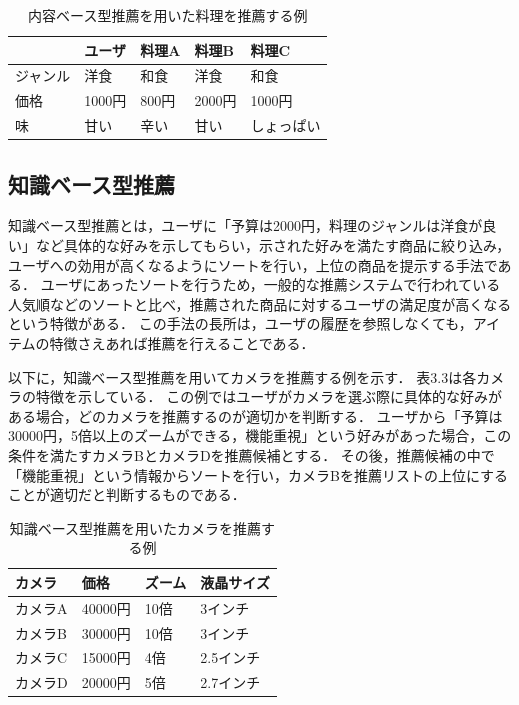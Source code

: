 \documentclass{funthesis}
\begin{document}
\begin{table}[htb]
  \begin{center}
  \scriptsize
    \caption{内容ベース型推薦を用いた料理を推薦する例}
    \normalsize
   \begin{tabular}{p{2.5cm}|p{2.5cm}||p{2.5cm}|p{2.5cm}|p{2.5cm}}
    \hline
    & ユーザ & 料理A & 料理B & 料理C  \\ \hline\hline
      ジャンル & 洋食 & 和食 & 洋食 & 和食 \\ \hline
      価格 & 1000円 & 800円 & 2000円 & 1000円 \\ \hline
      味 & 甘い & 辛い & 甘い & しょっぱい \\ \hline
  \end{tabular}
  \end{center}
\end{table}

\subsection{知識ベース型推薦}
知識ベース型推薦とは，ユーザに「予算は2000円，料理のジャンルは洋食が良い」など具体的な好みを示してもらい，示された好みを満たす商品に絞り込み，
ユーザへの効用が高くなるようにソートを行い，上位の商品を提示する手法である．
ユーザにあったソートを行うため，一般的な推薦システムで行われている人気順などのソートと比べ，推薦された商品に対するユーザの満足度が高くなるという特徴がある．
この手法の長所は，ユーザの履歴を参照しなくても，アイテムの特徴さえあれば推薦を行えることである．

以下に，知識ベース型推薦を用いてカメラを推薦する例を示す．
表3.3は各カメラの特徴を示している．
この例ではユーザがカメラを選ぶ際に具体的な好みがある場合，どのカメラを推薦するのが適切かを判断する．
ユーザから「予算は30000円，5倍以上のズームができる，機能重視」という好みがあった場合，この条件を満たすカメラBとカメラDを推薦候補とする．
その後，推薦候補の中で「機能重視」という情報からソートを行い，カメラBを推薦リストの上位にすることが適切だと判断するものである．

\begin{table}[htb]
  \begin{center}
  \scriptsize
    \caption{知識ベース型推薦を用いたカメラを推薦する例}
    \normalsize
   \begin{tabular}{p{3.3cm}||p{3.3cm}|p{3.3cm}|p{3.3cm}}
    \hline
カメラ & 価格 & ズーム & 液晶サイズ \\ \hline\hline
      カメラA & 40000円 & 10倍 & 3インチ \\ \hline
      カメラB & 30000円 & 10倍 & 3インチ \\ \hline
      カメラC & 15000円 & 4倍 & 2.5インチ \\ \hline
      カメラD & 20000円 & 5倍 & 2.7インチ \\ \hline
  \end{tabular}
  \end{center}
\end{table}
\end{document}
